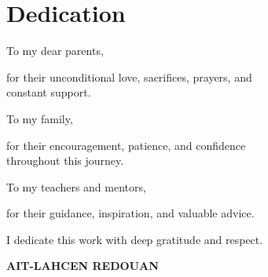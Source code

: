 \chapter*{Dedication}
\thispagestyle{plain}

\vspace*{2.5cm}

\begin{center}
\large
\itshape

To my dear parents,

\vspace{0.7cm}

for their unconditional love, sacrifices, prayers, and\\
constant support.

\vspace{0.9cm}

To my family,

\vspace{0.7cm}

for their encouragement, patience, and confidence\\
throughout this journey.

\vspace{0.9cm}

To my teachers and mentors,

\vspace{0.7cm}

for their guidance, inspiration, and valuable advice.

\vspace{1.1cm}

I dedicate this work with deep gratitude and respect.
\end{center}

\vspace{1.2cm}

\begin{flushright}
\large\bfseries AIT-LAHCEN REDOUAN
\end{flushright}

\clearpage
